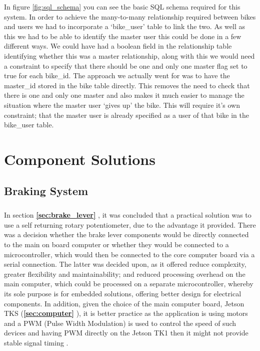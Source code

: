 \documentclass[a4paper]{report}
\begin{document}
{In figure \ref{fig:sql_schema} you can see the basic SQL schema required for this system. In order to achieve the many-to-many relationship required between bikes and users we had to incorporate a `bike\_user' table to link the two. As well as this we had to be able to identify the master user this could be done in a few different ways. We could have had a boolean field in the relationship table identifying whether this was a master relationship, along with this we would need a constraint to specify that there should be one and only one master flag set to true for each bike\_id. The approach we actually went for was to have the master\_id stored in the bike table directly. This removes the need to check that there is one and only one master and also makes it much easier to manage the situation where the master user `gives up' the bike. This will require it's own constraint; that the master user is already specified as a user of that bike in the bike\_user table.
\chapter{Component Solutions}
\label{sec:component_solutions}


\section{Braking System}
\label{sec:comp_design_brakes}

\paragraph{}In section \textbf{\ref{sec:brake_lever} }, it was concluded that a practical solution was to use a self returning rotary potentiometer, due to the advantage it provided. There was a decision whether the brake lever components would be directly connected to the main on board computer or whether they would be connected to a microcontroller, which would then be connected to the core computer board via a serial connection. The latter was decided upon, as it offered reduce complexity, greater flexibility and maintainability; and reduced processing overhead on the main computer, which could be processed on a separate microcontroller, whereby its sole purpose is for embedded solutions, offering better design for electrical components. In addition, given the choice of the main computer board, Jetson TKS (\textbf{\ref{sec:computer} }), it is better practice as the application is using motors and a PWM (Pulse Width Modulation) is used to control the speed of such devices and having PWM directly on the Jetson TK1 then it might not provide stable signal timing \cite{jetson_microcontroller_support}. 

}
\end{document}
